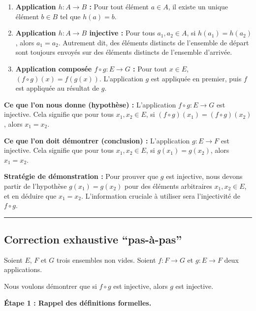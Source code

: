 \documentclass[12pt,a4paper]{report}
\providecommand{\tightlist}{%
  \setlength{\itemsep}{0pt}\setlength{\parskip}{0pt}}
\begin{document}
\begin{enumerate}
\def\labelenumi{\arabic{enumi}.}
\tightlist
\item
  \textbf{Application \(h: A \to B\) :} Pour tout élément \(a \in A\),
  il existe un unique élément \(b \in B\) tel que \(h(a) = b\).
\item
  \textbf{Application \(h: A \to B\) injective :} Pour tous
  \(a_1, a_2 \in A\), si \(h(a_1) = h(a_2)\), alors \(a_1 = a_2\).
  Autrement dit, des éléments distincts de l'ensemble de départ sont
  toujours envoyés sur des éléments distincts de l'ensemble d'arrivée.
\item
  \textbf{Application composée \(f \circ g : E \to G\) :} Pour tout
  \(x \in E\), \((f \circ g)(x) = f(g(x))\). L'application \(g\) est
  appliquée en premier, puis \(f\) est appliquée au résultat de \(g\).
\end{enumerate}

\textbf{Ce que l'on nous donne (hypothèse) :} L'application
\(f \circ g: E \to G\) est injective. Cela signifie que pour tous
\(x_1, x_2 \in E\), si \((f \circ g)(x_1) = (f \circ g)(x_2)\), alors
\(x_1 = x_2\).

\textbf{Ce que l'on doit démontrer (conclusion) :} L'application
\(g: E \to F\) est injective. Cela signifie que pour tous
\(x_1, x_2 \in E\), si \(g(x_1) = g(x_2)\), alors \(x_1 = x_2\).

\textbf{Stratégie de démonstration :} Pour prouver que \(g\) est
injective, nous devons partir de l'hypothèse \(g(x_1) = g(x_2)\) pour
des éléments arbitraires \(x_1, x_2 \in E\), et en déduire que
\(x_1 = x_2\). L'information cruciale à utiliser sera l'injectivité de
\(f \circ g\).

\begin{center}\rule{0.5\linewidth}{0.5pt}\end{center}

\subsection{Correction exhaustive
``pas-à-pas''}\label{correction-exhaustive-pas-uxe0-pas}

Soient \(E\), \(F\) et \(G\) trois ensembles non vides. Soient
\(f: F \to G\) et \(g: E \to F\) deux applications.

Nous voulons démontrer que si \(f \circ g\) est injective, alors \(g\)
est injective.

\textbf{Étape 1 : Rappel des définitions formelles.}
\end{document}
